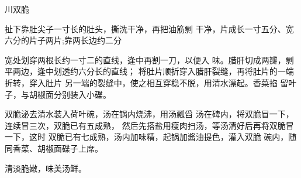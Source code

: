 \begin{recipe}{川双脆}

\ingredients


\cooking

\step 扯下靠肚尖子一寸长的肚头，撕洗干净，再把油筋剽 干净，片成长一寸五分、宽六分的片子两片;靠两长边约二分

宽处划穿两根长约一寸二的直线，逢中再割一刀，以便入 味。腊肝切成两瓣，剽平两边，逢中划透约六分长的直线； 将肚片顺折穿入腊肝裂缝，再将肚片的一端折转，穿入肚片 另一端的裂缝中，使之相互穿稳不脱，用清水漂起。香菜掐 留叶子，与胡椒面分别装入小碟。

\step 双脆泌去清水装入荷叶碗，汤在锅内烧沸，用汤瓢舀 汤在碑内，将双脆冒一下，连续冒三次，双脆已有五成熟， 然后先搭盐用瘦肉扫汤，等汤清好后再将双脆冒一下，这时 双脆已有七成熟，汤内加味精，起锅加酱油提色，灌入双脆 碗内，随同香菜、胡椒面碟子上席。

\notes

清淡脆嫩，味美汤鲜。

\end{recipe}

